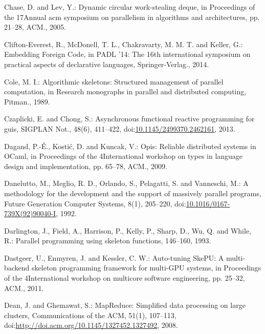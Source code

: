 \documentclass[paper=A4,twoside=true,openright,parskip=full,chapterprefix=true,headings=normal,bibliography=totoc,listof=totoc,titlepage=on,captions=tableabove,draft=false,british]{scrreprt}%
\begin{document}
\leavevmode\hypertarget{ref-Chase:2005:DCW:1073970.1073974}{}%
Chase, D. and Lev, Y.: Dynamic circular work-stealing deque, in
Proceedings of the 17Annual acm symposium on parallelism in algorithms
and architectures, pp. 21--28, ACM., 2005.

\leavevmode\hypertarget{ref-CMCK14}{}%
Clifton-Everest, R., McDonell, T. L., Chakravarty, M. M. T. and Keller,
G.: Embedding Foreign Code, in PADL '14: The 16th international
symposium on practical aspects of declarative languages,
Springer-Verlag., 2014.

\leavevmode\hypertarget{ref-Cole1989}{}%
Cole, M. I.: Algorithmic skeletons: Structured management of parallel
computation, in Research monographs in parallel and distributed
computing, Pitman., 1989.

\leavevmode\hypertarget{ref-Czaplicki:2013:AFR:2499370.2462161}{}%
Czaplicki, E. and Chong, S.: Asynchronous functional reactive
programming for guis, SIGPLAN Not., 48(6), 411--422,
doi:\href{https://doi.org/10.1145/2499370.2462161}{10.1145/2499370.2462161},
2013.

\leavevmode\hypertarget{ref-Dagand:2009:ORD:1481861.1481870}{}%
Dagand, P.-É., Kostić, D. and Kuncak, V.: Opis: Reliable distributed
systems in OCaml, in Proceedings of the 4International workshop on types
in language design and implementation, pp. 65--78, ACM., 2009.

\leavevmode\hypertarget{ref-DANELUTTO1992205}{}%
Danelutto, M., Meglio, R. D., Orlando, S., Pelagatti, S. and Vanneschi,
M.: A methodology for the development and the support of massively
parallel programs, Future Generation Computer Systems, 8(1), 205--220,
doi:\href{https://doi.org/10.1016/0167-739X(92)90040-I}{10.1016/0167-739X(92)90040-I},
1992.

\leavevmode\hypertarget{ref-darlington1993parallel}{}%
Darlington, J., Field, A., Harrison, P., Kelly, P., Sharp, D., Wu, Q.
and While, R.: Parallel programming using skeleton functions, 146--160,
1993.

\leavevmode\hypertarget{ref-Dastgeer:2011:ASM:1984693.1984697}{}%
Dastgeer, U., Enmyren, J. and Kessler, C. W.: Auto-tuning SkePU: A
multi-backend skeleton programming framework for multi-GPU systems, in
Proceedings of the 4International workshop on multicore software
engineering, pp. 25--32, ACM., 2011.

\leavevmode\hypertarget{ref-Dean:2008:MSD:1327452.1327492}{}%
Dean, J. and Ghemawat, S.: MapReduce: Simplified data processing on
large clusters, Communications of the ACM, 51(1), 107--113,\\
doi:\href{https://doi.org/http://doi.acm.org/10.1145/1327452.1327492}{http://doi.acm.org/10.1145/1327452.1327492},
2008.
\end{document}
